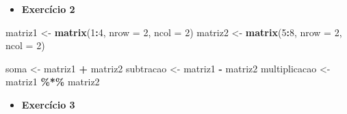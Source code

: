 \documentclass[
]{book}
\newenvironment{Shaded}{\begin{snugshade}}{\end{snugshade}}
\newcommand{\AttributeTok}[1]{\textcolor[rgb]{0.13,0.29,0.53}{#1}}
\newcommand{\DecValTok}[1]{\textcolor[rgb]{0.00,0.00,0.81}{#1}}
\newcommand{\FloatTok}[1]{\textcolor[rgb]{0.00,0.00,0.81}{#1}}
\newcommand{\FunctionTok}[1]{\textcolor[rgb]{0.13,0.29,0.53}{\textbf{#1}}}
\newcommand{\NormalTok}[1]{#1}
\newcommand{\OtherTok}[1]{\textcolor[rgb]{0.56,0.35,0.01}{#1}}
\newcommand{\SpecialCharTok}[1]{\textcolor[rgb]{0.81,0.36,0.00}{\textbf{#1}}}
\newcommand{\StringTok}[1]{\textcolor[rgb]{0.31,0.60,0.02}{#1}}
\providecommand{\tightlist}{%
  \setlength{\itemsep}{0pt}\setlength{\parskip}{0pt}}
\begin{document}
\begin{itemize}
\tightlist
\item
  \textbf{Exercício 2}
\end{itemize}

\begin{Shaded}
\begin{Highlighting}[]
\NormalTok{matriz1 }\OtherTok{\textless{}{-}} \FunctionTok{matrix}\NormalTok{(}\DecValTok{1}\SpecialCharTok{:}\DecValTok{4}\NormalTok{, }\AttributeTok{nrow =} \DecValTok{2}\NormalTok{, }\AttributeTok{ncol =} \DecValTok{2}\NormalTok{)}
\NormalTok{matriz2 }\OtherTok{\textless{}{-}} \FunctionTok{matrix}\NormalTok{(}\DecValTok{5}\SpecialCharTok{:}\DecValTok{8}\NormalTok{, }\AttributeTok{nrow =} \DecValTok{2}\NormalTok{, }\AttributeTok{ncol =} \DecValTok{2}\NormalTok{)}

\NormalTok{soma }\OtherTok{\textless{}{-}}\NormalTok{ matriz1 }\SpecialCharTok{+}\NormalTok{ matriz2}
\NormalTok{subtracao }\OtherTok{\textless{}{-}}\NormalTok{ matriz1 }\SpecialCharTok{{-}}\NormalTok{ matriz2}
\NormalTok{multiplicacao }\OtherTok{\textless{}{-}}\NormalTok{ matriz1 }\SpecialCharTok{\%*\%}\NormalTok{ matriz2}
\end{Highlighting}
\end{Shaded}

\begin{itemize}
\tightlist
\item
  \textbf{Exercício 3}
\end{itemize}

\begin{Shaded}
\end{Shaded}
\end{document}
